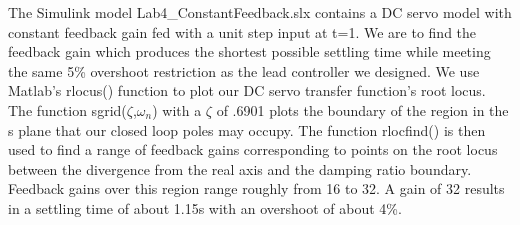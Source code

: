 \documentclass[11pt,a4paper]{article}
\begin{document}
The Simulink model Lab4\_ConstantFeedback.slx contains a DC servo model with constant feedback gain fed with a unit step input at t=1. We are to find the feedback gain which produces the shortest possible settling time while meeting the same 5\% overshoot restriction as the lead controller we designed. We use Matlab's rlocus() function to plot our DC servo transfer function's root locus. The function sgrid($\zeta$,$\omega_{n}$) with a $\zeta$ of .6901 plots the boundary of the region in the s plane that our closed loop poles may occupy. The function rlocfind() is then used to find a range of feedback gains corresponding to points on the root locus between the divergence from the real axis and the damping ratio boundary. Feedback gains over this region range roughly from 16 to 32. A gain of 32 results in a settling time of about 1.15s with an overshoot of about 4\%.
\end{document}
